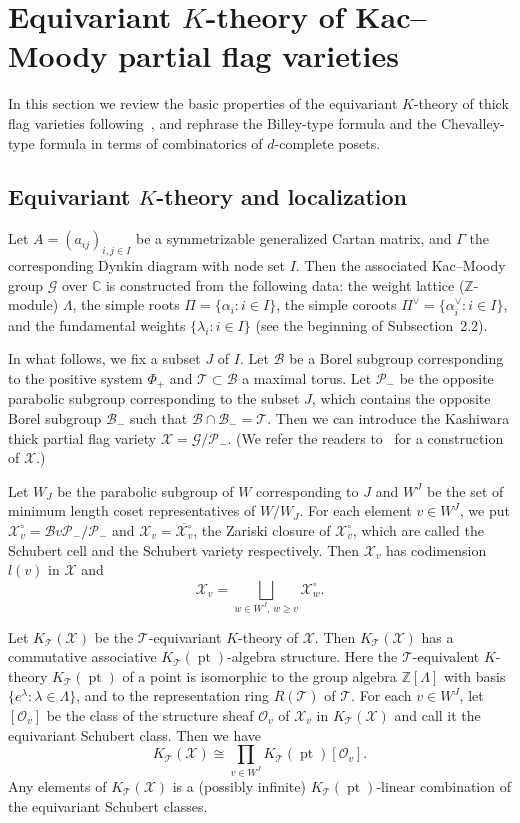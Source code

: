 \documentclass[10pt]{amsart}
\theoremstyle{definition}
\theoremstyle{remark}
\newcommand\Int{\mathbb{Z}}
\newcommand\Comp{\mathbb{C}}
\DeclareMathOperator{\point}{pt}
\newcommand\BB{\mathcal{B}}
\newcommand\GG{\mathcal{G}}
\newcommand\OO{\mathcal{O}}
\newcommand\PP{\mathcal{P}}
\newcommand\TT{\mathcal{T}}
\newcommand\XX{\mathcal{X}}
\begin{document}
\section{%
Equivariant \texorpdfstring{$K$}{K}-theory of Kac--Moody partial flag varieties
}\label{sect4}

In this section we review the basic properties of the equivariant $K$-theory 
of thick flag varieties following~\cite[Section~3]{LSS}, 
and rephrase the Billey-type formula and the Chevalley-type formula 
in terms of combinatorics of $d$-complete posets.

\subsection{Equivariant \texorpdfstring{$K$}{K}-theory and localization}\label{subsec4.1}

Let $A = (a_{ij})_{i,j \in I}$ be a symmetrizable generalized Cartan matrix, 
and $\Gamma$ the corresponding Dynkin diagram with node set $I$.
Then the associated Kac--Moody group $\mathcal{G}$ over $\Comp$ is constructed from the following data:
the weight lattice ($\Int$-module) $\Lambda$, the simple roots $\Pi = \{ \alpha_i : i \in I \}$, 
the simple coroots $\Pi^\vee = \{ \alpha^\vee_i :i \in I \}$, 
and the fundamental weights $\{ \lambda_i : i \in I \}$ (see the beginning of Subsection~2.2).

In what follows, we fix a subset $J$ of $I$.
Let $\BB$ be a Borel subgroup corresponding to the positive system $\Phi_+$ 
and $\TT \subset \BB$ a maximal torus.
Let $\PP_-$ be the opposite parabolic subgroup corresponding to the subset $J$, 
which contains the opposite Borel subgroup $\BB_-$ such that $\BB \cap \BB_- = \TT$.
Then we can introduce the Kashiwara thick partial flag variety $\XX = \GG/\PP_-$.
(We refer the readers to~\cite{Ka} for a construction of $\XX$.)

Let $W_J$ be the parabolic subgroup of $W$ corresponding to $J$ 
and $W^J$ be the set of minimum length coset representatives of $W/W_J$.
For each element $v \in W^J$, we put $\XX^\circ_v = \BB v \PP_-/\PP_-$ 
and $\XX_v = \overline{\XX^\circ_v}$, the Zariski closure of $\XX^\circ_v$, 
which are called the Schubert cell and the Schubert variety respectively.
Then $\XX_v$ has codimension $l(v)$ in $\XX$ and
$$
\XX_v = \bigsqcup_{w \in W^J, \, w \ge v} \XX^\circ_w.
$$

Let $K_\TT(\XX)$ be the $\TT$-equivariant $K$-theory of $\XX$.
Then $K_\TT(\XX)$ has a commutative associative $K_\TT(\point)$-algebra structure.
Here the $\TT$-equivalent $K$-theory $K_\TT(\point)$ of a point is isomorphic 
to the group algebra $\Int[\Lambda]$ with basis $\{ e^\lambda : \lambda \in \Lambda \}$, 
and to the representation ring $R(\TT)$ of $\TT$.
For each $v \in W^J$, let $[\OO_v]$ be the class of the structure sheaf $\OO_v$ of $\XX_v$ 
in $K_\TT(\XX)$ and call it the equivariant Schubert class.
Then we have
$$
K_\TT(\XX) \cong \prod_{v \in W^J} K_\TT(\point) [\OO_v].
$$
Any elements of $K_\TT(\XX)$ is a (possibly infinite) $K_\TT(\point)$-linear combination 
of the equivariant Schubert classes.
\end{document}
